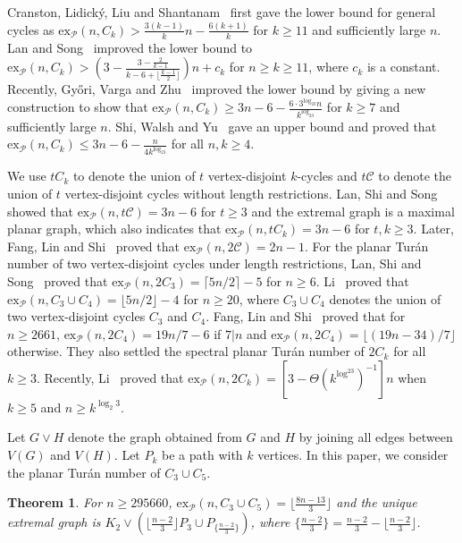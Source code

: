 \documentclass[12pt]{article}
\newtheorem{thm}{Theorem}[section]
\newcommand{\ex}{\mathrm{ex}}
\begin{document}
Cranston, Lidick\'{y}, Liu and Shantanam~\cite{daniel2022counterexample} first gave the lower bound for general cycles as $\ex_{\mathcal{P}}(n,C_k) > \frac{3(k-1)}{k}n-\frac{6(k+1)}{k}$ for $k\geq 11$ and sufficiently large $n$. Lan and Song~\cite{lan2022improved} improved the lower bound to $\ex_{\mathcal{P}}(n,C_{k}) > (3-\frac{3-\frac{2}{k-1}}{k-6+\lfloor \frac{k-1}{2}\rfloor})n+c_{k}$ for $n\geq k\geq 11$, where $c_{k}$ is a constant. Recently, Gy\H{o}ri, Varga and Zhu~\cite{gyHori2024new} improved the lower bound by giving a new construction to show that $\ex_{\mathcal{P}}(n,C_{k}) \geq 3n-6-\frac{6\cdot3^{\log_23}n}{k^{\log_23}}$ for $k\geq 7$ and sufficiently large $n$. Shi, Walsh and Yu~\cite{shi2025dense} gave an upper bound and proved that $\ex_{\mathcal{P}}(n,C_{k}) \leq 3n-6-\frac{n}{4k^{\log_23}}$ for all $n,k\geq4$.

We use $tC_k$ to denote the union of $t$ vertex-disjoint $k$-cycles and $t\mathcal{C}$ to denote the union of $t$ vertex-disjoint cycles without length restrictions. Lan, Shi and Song~\cite{lan2019hfree} showed that $\ex_{\mathcal{P}}(n,t\mathcal{C})=3n-6$ for $t\geq 3$ and the extremal graph is a maximal planar graph, which also indicates that $\ex_{\mathcal{P}}(n,tC_k)=3n-6$ for $t,k\geq 3$. Later, Fang, Lin and Shi~\cite{fang2024} proved that $\ex_{\mathcal{P}}(n,2\mathcal{C})=2n-1$. For the planar Tur\'an number of two vertex-disjoint cycles under length restrictions, Lan, Shi and Song~\cite{lan2024planar} proved that $\ex_{\mathcal{P}}(n,2C_3)=\lceil 5n/2 \rceil - 5$ for $n\geq 6$. Li~\cite{li2024} proved that $\ex_{\mathcal{P}}(n,C_3\cup C_4)=\lfloor 5n/2 \rfloor - 4$ for $n\geq 20$, where $C_3\cup C_4$ denotes the union of two vertex-disjoint cycles $C_3$ and $C_4$. Fang, Lin and Shi~\cite{fang2024} proved that for $n\geq 2661$, $\ex_{\mathcal{P}}(n,2C_4)=19n/7 - 6$ if $7|n$ and $\ex_{\mathcal{P}}(n,2C_4)=\lfloor (19n-34)/7 \rfloor$ otherwise. They also settled the spectral planar Tur\'an number of $2C_k$ for all $k\geq 3$. Recently, Li~\cite{li2025dense} proved that $\ex_{\mathcal{P}}(n,2C_k)=\left[3-\Theta(k^{\log^23})^{-1}\right]n$ when $k\geq 5$ and $n\geq k^{\log_{2}3}$.

Let $G\vee H$ denote the graph obtained from $G$ and $H$ by joining all edges between $V(G)$ and $V(H)$. Let $P_k$ be a path with $k$ vertices.
In this paper, we consider the planar Tur\'an number of $C_3\cup C_5$.

\begin{thm}\label{thm}
    For $n\geq 295660$, $\ex_{\mathcal{P}}(n,C_3\cup C_5)=\lfloor\frac{8n-13}{3}\rfloor$ and the unique extremal graph is $K_2\vee (\lfloor\frac{n-2}{3}\rfloor P_3\cup P_{\{\frac{n-2}{3}\}})$, where $\{\frac{n-2}{3} \}=\frac{n-2}{3}-\lfloor\frac{n-2}{3}\rfloor$.
\end{thm}
\end{document}
